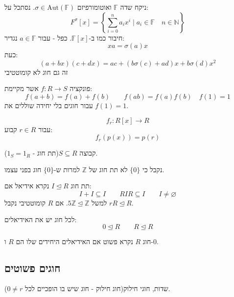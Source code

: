 \documentclass{tstextbook}
\begin{document}
\begin{definition}
ניקח שדה \(\mathbb{F}\) ואוטומורפיזם \(\sigma \in \mathrm{Aut}(\mathbb{F})\). נסתכל על:
$$F^{\sigma}[x]=\left\{  \sum_{i=0}^{n}a_{i}x^{i}\mid a_{i}\in \mathbb{F} \quad n \in \mathbb{N}  \right\}$$
חיבור כמו ב-\(\mathbb{F}[x]\). כפל - עבור \(a\in \mathbb{F}\) נגדיר:
$$xa=\sigma(a)x$$
כעת:
$$(a+bx)(c+dx)=ac+(b\sigma(c)+ad)x+b\sigma(d)x^{2}$$
זה גם חוג לא קומוטטיבי

\end{definition}
\begin{definition}
פונקציה \(f:R\to S\) אשר מקיימת:
$$f(a+b)=f(a)+f(b)\qquad f(ab)=f(a)f(b)\quad f(1)=1$$
עבור חוגים בלי יחידה שוללים את \(f(1)=1\).

\end{definition}
\begin{example}
$$f_{r}:R[x]\to R$$
עבור \(r \in R\) קבוע:
$$f_{r}(p(x))=p(r)$$

\end{example}
\begin{definition}[תת חוג]
קבוצה \(S \subseteq R\)(תת חוג - \(1_{S}=1_{R}\)).

\end{definition}
\begin{remark}
נקבל כי \(\{ 0 \}\) לא תת חוג של \(\mathbb{Z}\) למרות ש-\(\{ 0 \}\) חוג בפני עצמו.

\end{remark}
\begin{definition}[אידיאל]
תת חוג \(I\trianglelefteq R\) נקרא אידיאל אם:
$$I+I\subseteq I\qquad RIR\subseteq I\qquad I\neq \varnothing $$
למשל \(5\mathbb{Z}\trianglelefteq \mathbb{Z}\). אם \(R\) קומוטטיבי נקבל \(rR\trianglelefteq R\).

\end{definition}
\begin{proposition}
לכל חוג יש את האידיאלים:
$$0\trianglelefteq  R \qquad R \trianglelefteq  R$$

\end{proposition}
\begin{definition}
חוג \(R\) נקרא פשוט אם האידיאלים היחידים שלו הם \(R\) ו-\(0\).

\end{definition}
\subsection{חוגים פשוטים}

שדות, חוגי חילוק(חוג חילוק - חוג שיש בו הופכיים לכל \(0\neq r\)).
\end{document}
